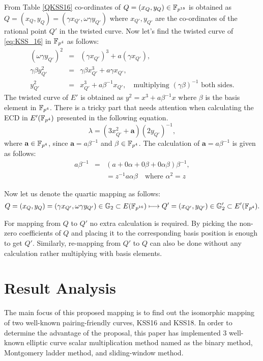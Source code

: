 From Table \ref{QKSS16} co-ordinates of  $Q = (x_Q,y_Q) \in \mathbb{F}_{p^{18}}$ is obtained as $Q = (x_Q,y_Q) = (\gamma x_{Q'}, \omega \gamma y_{Q'}) $ where $x_{Q'},y_{Q'}$ are the co-ordinates of the rational point $Q'$ in the twisted curve. Now let's find the twisted curve of \eqref{eq:KSS_16} in $\mathbb{F}_{p^4}$ as follows:
\begin{eqnarray}
(\omega\gamma y_{Q'} )^2 & = & (\gamma x_{Q'})^3 + a (\gamma x_{Q'}), \nonumber \\
\gamma \beta y_{Q'}^2 & = & \gamma \beta x_{Q'}^3 + a \gamma x_{Q'}, \nonumber \\
y_{Q'}^2 & = & x_{Q'}^3 + a \beta^{-1}x_{Q'}, \quad  \mbox{multiplying $(\gamma \beta)^{-1}$ both sides.}
\end{eqnarray}
 The twisted curve of $E'$ is obtained as $y^2  =  x^3 + a \beta^{-1}x$ where $\beta$ is the basis element in $\mathbb{F}_{p^4}$. 
 There is a tricky part that needs attention when calculating the ECD in $E'(\mathbb{F}_{p^4})$ presented in the following equation.
 \begin{equation}
 \lambda =   (3x_{Q'}^2+\textbf{a})(2y_{Q'})^{-1},
 \end{equation}
 where $\textbf{a} \in \mathbb{F}_{p^4}$, since $\textbf{a} = a \beta^{-1}$ and $\beta \in \mathbb{F}_{p^4}$. The calculation of $\textbf{a} = a \beta^{-1}$
 is given as follows:
 \begin{eqnarray}
  a \beta^{-1} & = & (a + 0\alpha + 0 \beta + 0 \alpha \beta) \beta ^{-1}, \nonumber \\
  & & = z^{-1} a \alpha \beta \quad \mbox{where $\alpha^2 = z$}
 \end{eqnarray}
 
 Now let us denote the quartic mapping as follows:
 \begin{equation}
Q = (x_Q,y_Q) = (\gamma x_{Q'}, \omega \gamma y_{Q'}) \in {\mathbb{G}}_{2} \subset E(\mathbb{F}_{p^{16}})   \longmapsto  Q' = (x_{Q'},y_{Q'}) \in {\mathbb{G}}_{2}'  \subset E'(\mathbb{F}_{p^4}).  \nonumber
 \end{equation}
 
 For mapping from $Q$ to $Q'$ no extra calculation is required. By picking the non-zero coefficients  of $Q$ and placing it to the corresponding basis position is enough to get $Q'$. Similarly, re-mapping from $Q'$ to $Q$  can also be done without any calculation rather multiplying with basis elements.  

\section{Result Analysis}
The main focus of this proposed mapping is to find out the isomorphic mapping of two well-known pairing-friendly curves, KSS16 and KSS18. In order to determine the advantage of the proposal, this paper has implemented 3 well-known elliptic curve scalar multiplication method named as the binary method, Montgomery ladder method, and sliding-window method.

